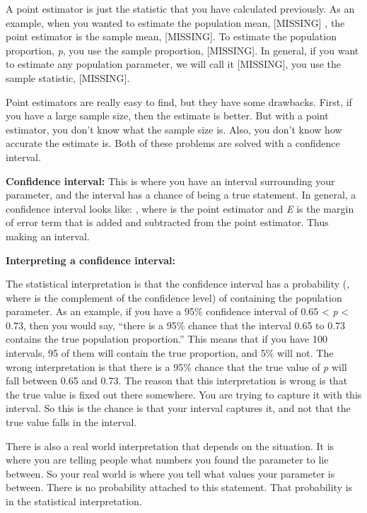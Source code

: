 \documentclass[]{book}
\begin{document}
A point estimator is just the statistic that you have calculated previously. As an example, when you wanted to estimate the population mean, {[}MISSING{]} , the point estimator is the sample mean, {[}MISSING{]}. To estimate the population proportion, \emph{p}, you use the sample proportion, {[}MISSING{]}. In general, if you want to estimate any population parameter, we will call it {[}MISSING{]}, you use the sample statistic, {[}MISSING{]}.

Point estimators are really easy to find, but they have some drawbacks. First, if you have a large sample size, then the estimate is better. But with a point estimator, you don't know what the sample size is. Also, you don't know how accurate the estimate is. Both of these problems are solved with a confidence interval.

\textbf{Confidence interval:} This is where you have an interval surrounding your parameter, and the interval has a chance of being a true statement. In general, a confidence interval looks like: , where is the point estimator and \emph{E} is the margin of error term that is added and subtracted from the point estimator. Thus making an interval.

\textbf{Interpreting a confidence interval: }

The statistical interpretation is that the confidence interval has a probability (, where is the complement of the confidence level) of containing the population parameter. As an example, if you have a 95\% confidence interval of 0.65 \textless{} \emph{p} \textless{} 0.73, then you would say, ``there is a 95\% chance that the interval 0.65 to 0.73 contains the true population proportion.'' This means that if you have 100 intervals, 95 of them will contain the true proportion, and 5\% will not. The wrong interpretation is that there is a 95\% chance that the true value of \emph{p} will fall between 0.65 and 0.73. The reason that this interpretation is wrong is that the true value is fixed out there somewhere. You are trying to capture it with this interval. So this is the chance is that your interval captures it, and not that the true value falls in the interval.

There is also a real world interpretation that depends on the situation. It is where you are telling people what numbers you found the parameter to lie between. So your real world is where you tell what values your parameter is between. There is no probability attached to this statement. That probability is in the statistical interpretation.
\end{document}
